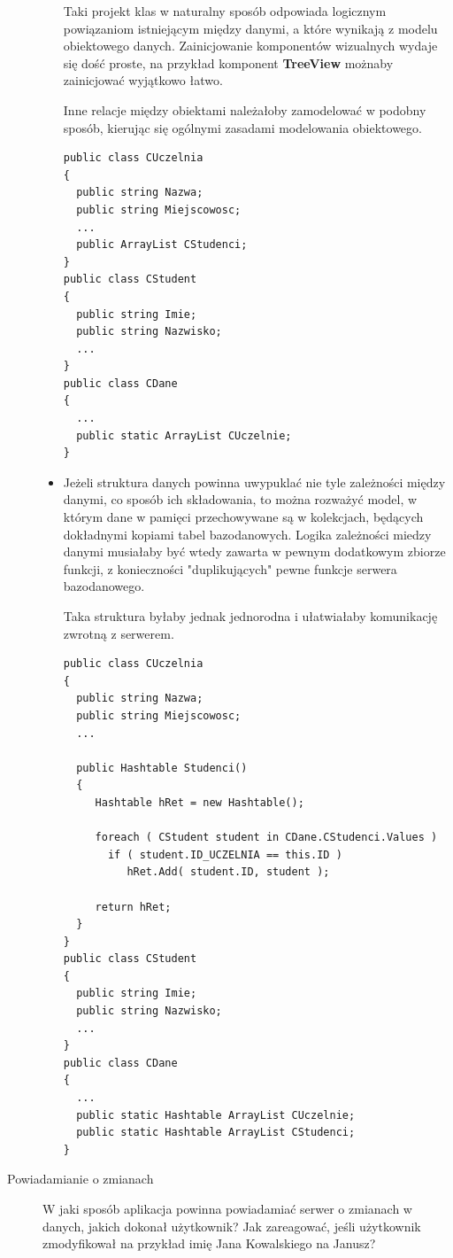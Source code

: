\begin{description}
\begin{itemize}
	Taki projekt klas w naturalny sposób odpowiada logicznym powiązaniom istniejącym między danymi,
	a które wynikają z modelu obiektowego danych. Zainicjowanie komponentów wizualnych wydaje się
	dość proste, na przykład komponent {\bf TreeView} możnaby zainicjować wyjątkowo łatwo. 

	Inne relacje między obiektami należałoby zamodelować w podobny sposób, kierując się
	ogólnymi zasadami modelowania obiektowego.

\begin{scriptsize}
\begin{verbatim}
public class CUczelnia
{
  public string Nazwa;
  public string Miejscowosc;
  ...
  public ArrayList CStudenci;
}
public class CStudent
{
  public string Imie;
  public string Nazwisko;
  ...
}
public class CDane
{
  ...
  public static ArrayList CUczelnie;
}
\end{verbatim}
\end{scriptsize}

	\item Jeżeli struktura danych powinna uwypuklać nie tyle zależności między danymi, co sposób
	ich składowania, to można rozważyć model, w którym dane w pamięci przechowywane są w kolekcjach,
	będących dokładnymi kopiami tabel bazodanowych. Logika zależności miedzy danymi musiałaby być
	wtedy zawarta w pewnym dodatkowym zbiorze funkcji, z konieczności "duplikujących" pewne funkcje
	serwera bazodanowego. 

	Taka struktura byłaby jednak jednorodna i ułatwiałaby komunikację zwrotną z serwerem.

\begin{scriptsize}
\begin{verbatim}
public class CUczelnia
{
  public string Nazwa;
  public string Miejscowosc;
  ...

  public Hashtable Studenci()
  {
     Hashtable hRet = new Hashtable();

     foreach ( CStudent student in CDane.CStudenci.Values )
       if ( student.ID_UCZELNIA == this.ID )
          hRet.Add( student.ID, student );
	  
     return hRet;
  }
}
public class CStudent
{
  public string Imie;
  public string Nazwisko;
  ...
}
public class CDane
{
  ...
  public static Hashtable ArrayList CUczelnie;
  public static Hashtable ArrayList CStudenci;
}
\end{verbatim}
\end{scriptsize}

	\end{itemize}
\item [Powiadamianie o zmianach] W jaki sposób aplikacja powinna powiadamiać serwer o zmianach w danych,
jakich dokonał użytkownik? Jak zareagować, jeśli użytkownik zmodyfikował na przykład imię Jana Kowalskiego
na Janusz?


\end{description}
